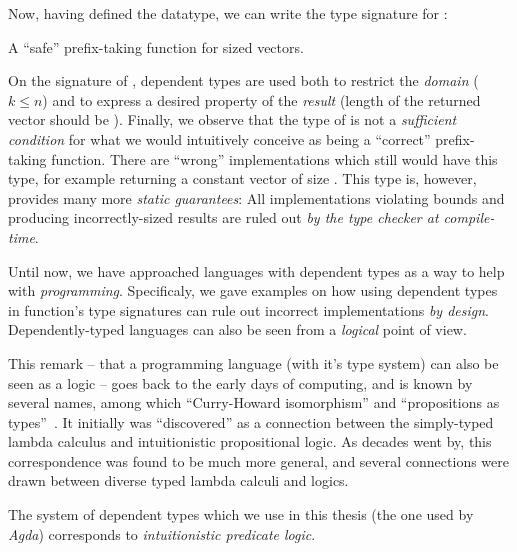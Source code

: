             Now, having defined the   datatype, we can write the type signature for :
            \begin{listing}[h]
                \caption{A ``safe'' prefix-taking function for sized vectors. \label{lst:take-decl}}
            \end{listing}

            On the signature of , dependent types are used both to restrict the \emph{domain}
            ($ k \leq n $) and to express a desired property of the \emph{result}
            (length of the returned vector should be ).
            Finally, we observe that the type of  is not a \emph{sufficient condition} for
            what we would intuitively conceive as being a ``correct'' prefix-taking function.
            There are ``wrong'' implementations which still would have this type, for example
            returning a constant vector of size .
            This type is, however, provides many more \emph{static guarantees}:
            All implementations violating bounds and producing incorrectly-sized results
            are ruled out \emph{by the type checker at compile-time}.

            Until now, we have approached languages with dependent types as a way to help with \emph{programming}.
            Specificaly, we gave examples on how using dependent types in function's type signatures
            can rule out incorrect implementations \emph{by design}.
            Dependently-typed languages can also be seen from a \emph{logical} point of view.

            This remark -- that a programming language (with it's type system) can also be seen as a logic --
            goes back to the early days of computing, and is known by several names,
            among which ``Curry-Howard isomorphism'' and ``propositions as types''~\cite{propositions-as-types}.
            It initially was ``discovered'' as a connection between the simply-typed lambda calculus
            and intuitionistic propositional logic.
            As decades went by, this correspondence was found to be much more general,
            and several connections were drawn between diverse typed lambda calculi and logics.

            The system of dependent types which we use in this thesis (the one used by \emph{Agda})
            corresponds to \emph{intuitionistic predicate logic}.

